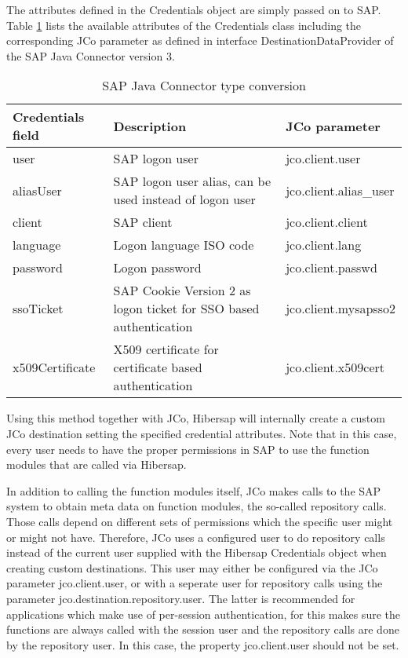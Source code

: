 The attributes defined in the Credentials object are simply passed on to SAP. Table \ref{tab:SAPCredentials} lists the available attributes of the Credentials class including the corresponding JCo parameter as defined in interface DestinationDataProvider of the SAP Java Connector version 3.

\begin{table}[H]
  \renewcommand{\arraystretch}{1.5}
  \centering
   \begin{tabularx}{\textwidth}{ l X l }
    \toprule
    \textbf{Credentials field} & \textbf{Description}               & \textbf{JCo parameter} \\ 
    \midrule
    user                       & SAP logon user                     & jco.client.user \\
    aliasUser                  & SAP logon user alias, can be used 
                                 instead of logon user              & jco.client.alias\_user \\
    client                     & SAP client                         & jco.client.client \\
    language                   & Logon language ISO code            & jco.client.lang \\
    password                   & Logon password                     & jco.client.passwd \\
    ssoTicket                  & SAP Cookie Version 2 as logon 
                                 ticket for SSO based 
                                 authentication                     & jco.client.mysapsso2 \\
    x509Certificate            & X509 certificate for certificate 
                                 based authentication               & jco.client.x509cert \\
    \bottomrule
  \end{tabularx}
  \caption{SAP Java Connector type conversion}
  \label{tab:SAPCredentials}
\end{table}

Using this method together with JCo, Hibersap will internally create a custom JCo destination setting the specified credential attributes. Note that in this case, every user needs to have the proper permissions in SAP to use the function modules that are called via Hibersap. 

In addition to calling the function modules itself, JCo makes calls to the SAP system to obtain meta data on function modules, the so-called repository calls. Those calls depend on different sets of permissions which the specific user might or might not have. Therefore, JCo uses a configured user to do repository calls instead of the current user supplied with the Hibersap Credentials object when creating custom destinations. This user may either be configured via the JCo parameter jco.client.user, or with a seperate user for repository calls using the parameter jco.destination.repository.user. The latter is recommended for applications which make use of per-session authentication, for this makes sure the functions are always called with the session user and the repository calls are done by the repository user. In this case, the property jco.client.user should not be set.

